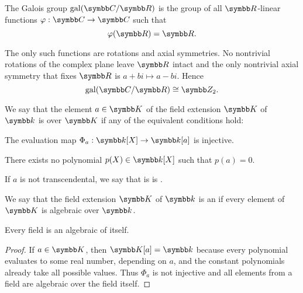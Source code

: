 \begin{example}\label{thm:galois_group_complex_over_real}
  The Galois group \( \Gal(\C / \R) \) is the group of all \( \R \)-linear functions \( \varphi: \C \to \C \) such that
  \begin{equation*}
    \varphi(\R) = \R.
  \end{equation*}

  The only such functions are rotations and axial symmetries. No nontrivial rotations of the complex plane leave \( \R \) intact and the only nontrivial axial symmetry that fixes \( \R \) is \( a + bi \mapsto a - bi \). Hence
  \begin{equation*}
    \Gal(\C / \R) \cong \Z_2.
  \end{equation*}
\end{example}

\begin{definition}\label{def:transcendetal_element}\cite[454]{Knapp2016BAlg}
  We say that the element \( a \in \K \) of the field extension \( \K \) of \( \k \) is  over \( \K \) if any of the equivalent conditions hold:
  \begin{defenum}
     The evaluation map \( \Phi_a: \k[X] \to \k[a] \) is injective.

     There exists no polynomial \( p(X) \in \k[X] \) such that \( p(a) = 0 \).
  \end{defenum}

  If \( a \) is not transcendental, we say that is is .
\end{definition}

\begin{definition}\label{def:algebraic_extension}\cite[456]{Knapp2016BAlg}
  We say that the field extension \( \K \) of \( \k \) is an  if every element of \( \K \) is algebraic over \( \k \).
\end{definition}

\begin{proposition}\label{thm:field_elements_are_algebraic}
  Every field is an algebraic of itself.
\end{proposition}
\begin{proof}
  If \( a \in \K \), then \( \K[a] = \k \) because every polynomial evaluates to some real number, depending on \( a \), and the constant polynomials already take all possible values. Thus \( \Phi_a \) is not injective and all elements from a field are algebraic over the field itself.
\end{proof}

